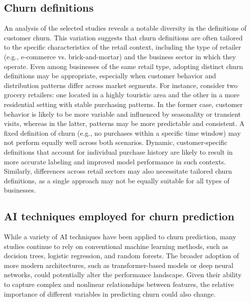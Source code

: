 \documentclass[preprint,12pt]{elsarticle}
\begin{document}
\subsection{Churn definitions}
\noindent An analysis of the selected studies reveals a notable diversity in the definitions of customer churn. This variation suggests that churn definitions are often tailored to the specific characteristics of the retail context, including the type of retailer (e.g., e-commerce vs. brick-and-mortar) and the business sector in which they operate. 
Even among businesses of the same retail type, adopting distinct churn definitions may be appropriate, especially when customer behavior and distribution patterns differ across market segments.
For instance, consider two grocery retailers: one located in a highly touristic area and the other in a more residential setting with stable purchasing patterns. In the former case, customer behavior is likely to be more variable and influenced by seasonality or transient visits, whereas in the latter, patterns may be more predictable and consistent. A fixed definition of churn (e.g., no purchases within a specific time window) may not perform equally well across both scenarios. 
Dynamic, customer-specific definitions that account for individual purchase history are likely to result in more accurate labeling and improved model performance in such contexts.
Similarly, differences across retail sectors may also necessitate tailored churn definitions, as a single approach may not be equally suitable for all types of businesses.

\subsection{AI techniques employed for churn prediction}

\noindent While a variety of AI techniques have been applied to churn prediction, many studies continue to rely on conventional machine learning methods, such as decision trees, logistic regression, and random forests. 
The broader adoption of more modern architectures, such as transformer-based models or deep neural networks, could potentially alter the performance landscape. Given their ability to capture complex and nonlinear relationships between features, the relative importance of different variables in predicting churn could also change.
\end{document}
